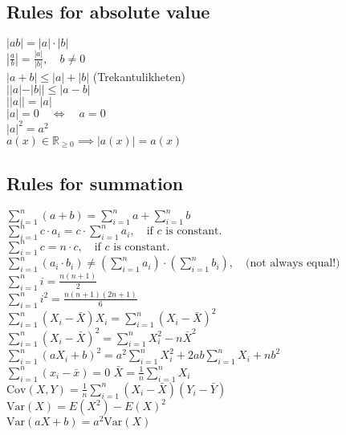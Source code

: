 \documentclass[a4paper,7pt,fleqn]{article}
\begin{document}
\begin{multicols}{3}
\begin{minipage}{\linewidth}
\subsection{Rules for absolute value} 
\(|ab| = |a| \cdot |b|\)\\
\(\left| \frac{a}{b} \right| = \frac{|a|}{|b|}, \quad b \neq 0\)\\
\(|a + b| \leq |a| + |b|\)  (Trekantulikheten)\\
\(||a| - |b|| \leq |a - b|\)\\
\(||a|| = |a|\)\\
\(|a| = 0 \quad \Leftrightarrow \quad a = 0\)\\
\(|a|^2 = a^2\)\\
\(a(x) \in \mathbb{R}_{\geq 0} \implies |a(x)| = a(x)\)\\

\end{minipage}
\begin{minipage}{\linewidth}
\subsection{Rules for summation} 

\(\sum_{i=1}^n (a + b) = \sum_{i=1}^n a + \sum_{i=1}^n b\) \\
\(\sum_{i=1}^n c \cdot a_i = c \cdot \sum_{i=1}^n a_i, \quad \text{if } c \text{ is constant.}\) \\
\(\sum_{i=1}^n c = n \cdot c, \quad \text{if } c \text{ is constant.}\) \\
\(\sum_{i=1}^n (a_i \cdot b_i) \neq \left( \sum_{i=1}^n a_i \right) \cdot \left( \sum_{i=1}^n b_i \right), \quad \text{(not always equal!)}\) \\
\(\sum_{i=1}^n i = \frac{n(n+1)}{2}\) \\
\(\sum_{i=1}^n i^2 = \frac{n(n+1)(2n+1)}{6}\) \\
\(\sum_{i=1}^n (X_i - \bar{X}) X_i = \sum_{i=1}^n (X_i - \bar{X})^2\) \\
\(\sum_{i=1}^n (X_i - \bar{X})^2 = \sum_{i=1}^n X_i^2 - n\bar{X}^2\) \\
\(\sum_{i=1}^n (a X_i + b)^2 = a^2 \sum_{i=1}^n X_i^2 + 2ab \sum_{i=1}^n X_i + nb^2\) \\
\(\sum_{i=1}^n (x_i - \bar{x}) = 0\)
\(\bar{X} = \frac{1}{n} \sum_{i=1}^n X_i\)
\(\text{Cov}(X, Y) = \frac{1}{n} \sum_{i=1}^n (X_i - \bar{X})(Y_i - \bar{Y})\) \\
\(\text{Var}(X) = E(X^2) - E(X)^2\) \\
\(\text{Var}(aX + b) = a^2 \text{Var}(X)\) \\
\end{minipage}



\end{multicols}
\end{document}
